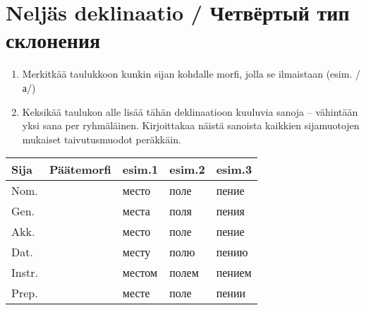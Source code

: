\documentclass[paper=a4, fontsize=11pt]{scrartcl}
\providecommand{\tightlist}{%
  \setlength{\itemsep}{0pt}\setlength{\parskip}{0pt}}
\begin{document}
\section{Neljäs deklinaatio / Четвёртый тип
склонения}\label{neljuxe4s-deklinaatio-ux447ux435ux442ux432ux451ux440ux442ux44bux439-ux442ux438ux43f-ux441ux43aux43bux43eux43dux435ux43dux438ux44f}

\begin{enumerate}
\def\labelenumi{\arabic{enumi}.}
\tightlist
\item
  Merkitkää taulukkoon kunkin sijan kohdalle morfi, jolla se ilmaistaan
  (esim. /а/)
\item
  Keksikää taulukon alle lisää tähän deklinaatioon kuuluvia sanoja --
  vähintään yksi sana per ryhmäläinen. Kirjoittakaa näistä sanoista kaikkien
  sijamuotojen mukaiset taivutusmuodot peräkkäin.
\end{enumerate}


{
\begin{longtable}[c]{@{}lllll@{}}
\toprule
Sija & Päätemorfi & esim.1 & esim.2 & esim.3\tabularnewline
\midrule
\endhead
Nom. & & место & поле & пение\tabularnewline
Gen. & & места & поля & пения\tabularnewline
Akk. & & место & поле & пение\tabularnewline
Dat. & & месту & полю & пению\tabularnewline
Instr. & & местом & полем & пением\tabularnewline
Prep. & & месте & поле & пении\tabularnewline
\bottomrule
\end{longtable}
}


\begin{center}

\vspace{1.1cm} 

\underline{\hspace{12cm}} \\
\vspace{0.5cm}
\underline{\hspace{12cm}} \\
\vspace{0.5cm}
\underline{\hspace{12cm}} \\
\vspace{0.5cm}
\underline{\hspace{12cm}} \\
\vspace{0.5cm}
\underline{\hspace{12cm}} \\
\vspace{0.5cm}
\underline{\hspace{12cm}} \\
\vspace{0.5cm}
\underline{\hspace{12cm}} \\
\vspace{0.5cm}
\underline{\hspace{12cm}} \\
\vspace{0.5cm}
\underline{\hspace{12cm}} \\

\end{center}
\clearpage
\end{document}
